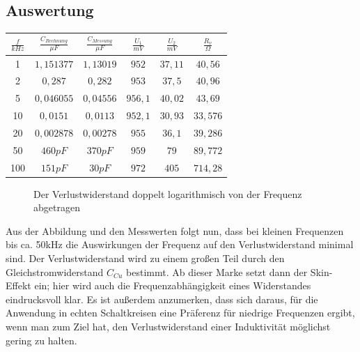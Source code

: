 \documentclass{article}
\begin{document}
\subsection{Auswertung}
\begin{center}

  \begin{tabular}{|c|c|c|c|c|c|}
    \hline
    $\frac{f}{kHz}$ & $\frac{C_{Rechnung}}{\mu F}$ & $\frac{C_{Messung}}{\mu F}$ & $\frac{U_1}{mV}$ & $\frac{U_2}{mV}$ & $\frac{R_v}{\Omega}$ \\
    \hline
    1               & $1,151377$                   & $1,13019$                   & $952$            & $37,11$          & $40,56$              \\
    \hline
    2               & $0,287$                      & $0,282$                     & $953$            & $37,5$           & $40,96$              \\
    \hline
    5               & $0,046055$                   & $0,04556$                   & $956,1$          & $40,02$          & $43,69$              \\
    \hline
    10              & $0,0151$                     & $0,0113$                    & $952,1$          & $30,93$          & $33,576$             \\
    \hline
    20              & $0,002878$                   & $0,00278$                   & $955$            & $36,1$           & $39,286$             \\
    \hline
    50              & $460pF$                      & $370pF$                     & $959$            & $79$             & $89,772$             \\
    \hline
    100             & $151pF$                      & $30pF$                      & $972$            & $405$            & $714,28$             \\
    \hline
  \end{tabular}
\end{center}
\begin{figure}[h]
  \begin{center}

    \caption{Der Verlustwiderstand doppelt logarithmisch von der Frequenz abgetragen}
  \end{center}
\end{figure}
Aus der Abbildung und den Messwerten folgt nun, dass bei kleinen Frequenzen bis ca. 50kHz die Auswirkungen der Frequenz auf den Verlustwiderstand minimal sind.
Der Verlustwiderstand wird zu einem großen Teil durch den Gleichstromwiderstand $C_{Cu}$ bestimmt. Ab dieser Marke setzt dann der Skin-Effekt ein; hier wird auch die
Frequenzabhängigkeit eines Widerstandes eindrucksvoll klar. Es ist außerdem anzumerken, dass sich daraus, für die Anwendung in echten Schaltkreisen eine Präferenz für niedrige Frequenzen ergibt,
wenn man zum Ziel hat, den Verlustwiderstand einer Induktivität möglichst gering zu halten.
\end{document}
